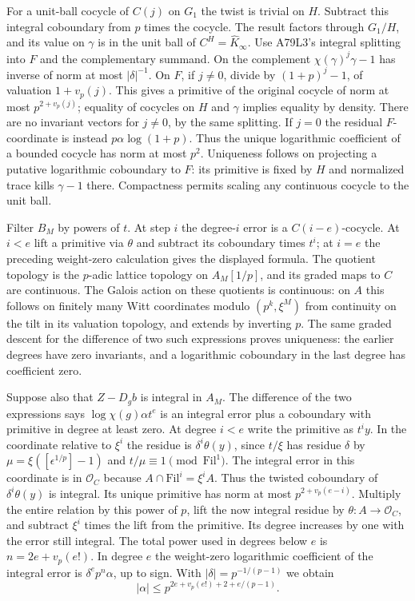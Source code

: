 For a unit-ball cocycle of $C(j)$ on $G_1$ the twist is trivial
on $H$. Subtract this integral coboundary from $p$ times the
cocycle. The result factors through $G_1/H$, and its value on
$\gamma$ is in the unit ball of $C^H=\widehat K_\infty$.
Use A79L3's integral splitting into $F$ and the complementary
summand. On the complement $\chi(\gamma)^j\gamma-1$ has inverse
of norm at most $|\delta|^{-1}$. On $F$, if $j\ne0$, divide by
$(1+p)^j-1$, of valuation $1+v_p(j)$. This gives a primitive of
the original cocycle of norm at most $p^{2+v_p(j)}$; equality of
cocycles on $H$ and $\gamma$ implies equality by density.
There are no invariant vectors for $j\ne0$, by the same splitting.
If $j=0$ the residual $F$-coordinate is instead $p\alpha\log(1+p)$.
Thus the unique logarithmic coefficient of a bounded cocycle has
norm at most $p^2$. Uniqueness follows on projecting a putative
logarithmic coboundary to $F$: its primitive is fixed by $H$ and
normalized trace kills $\gamma-1$ there. Compactness permits
scaling any continuous cocycle to the unit ball.

Filter $B_M$ by powers of $t$. At step $i$ the degree-$i$ error
is a $C(i-e)$-cocycle. At $i<e$ lift a primitive via $\theta$
and subtract its coboundary times $t^i$; at $i=e$ the preceding
weight-zero calculation gives the displayed formula. The quotient
topology is the $p$-adic lattice topology on $A_M[1/p]$, and
its graded maps to $C$ are continuous. The Galois action on
these quotients is continuous: on $A$ this follows on finitely
many Witt coordinates modulo $(p^k,\xi^M)$ from continuity on
the tilt in its valuation topology, and extends by inverting $p$.
The same graded descent for the difference of two such expressions
proves uniqueness: the earlier degrees have zero invariants, and
a logarithmic coboundary in the last degree has coefficient zero.

Suppose also that $Z-D_g b$ is integral in $A_M$. The difference
of the two expressions says $\log\chi(g)\alpha t^e$ is an integral
error plus a coboundary with primitive in degree at least zero.
At degree $i<e$ write the primitive as $t^i y$. In the coordinate
relative to $\xi^i$ the residue is $\delta^i\theta(y)$, since
$t/\xi$ has residue $\delta$ by $\mu=\xi([\epsilon^{1/p}]-1)$
and $t/\mu\equiv1\pmod{\mathrm{Fil}^1}$. The integral error in
this coordinate is in $\mathcal O_C$ because
$A\cap\mathrm{Fil}^i=\xi^iA$. Thus the twisted coboundary of
$\delta^i\theta(y)$ is integral. Its unique primitive has norm
at most $p^{2+v_p(e-i)}$. Multiply the entire relation by this
power of $p$, lift the now integral residue by $\theta:A\to\mathcal O_C$,
and subtract $\xi^i$ times the lift from the primitive. Its degree
increases by one with the error still integral. The total power
used in degrees below $e$ is $n=2e+v_p(e!)$. In degree $e$ the
weight-zero logarithmic coefficient of the integral error is
$\delta^e p^n\alpha$, up to sign. With $|\delta|=p^{-1/(p-1)}$
we obtain
\[
                      |\alpha|\le p^{2e+v_p(e!)+2+e/(p-1)}.
\]

